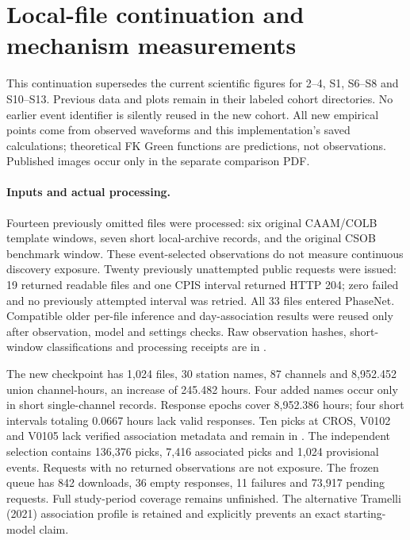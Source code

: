 \section{Local-file continuation and mechanism measurements}
This continuation supersedes the current scientific figures for 2--4, S1, S6--S8 and S10--S13. Previous data and plots remain in their labeled cohort directories. No earlier event identifier is silently reused in the new cohort. All new empirical points come from observed waveforms and this implementation's saved calculations; theoretical FK Green functions are predictions, not observations. Published images occur only in the separate comparison PDF.

\paragraph{Inputs and actual processing.}
Fourteen previously omitted files were processed: six original CAAM/COLB template windows, seven short local-archive records, and the original CSOB benchmark window. These event-selected observations do not measure continuous discovery exposure. Twenty previously unattempted public requests were issued: 19 returned readable files and one CPIS interval returned HTTP 204; zero failed and no previously attempted interval was retried. All 33 files entered PhaseNet. Compatible older per-file inference and day-association results were reused only after observation, model and settings checks. Raw observation hashes, short-window classifications and processing receipts are in .

The new checkpoint has 1,024 files, 30 station names, 87 channels and 8,952.452 union channel-hours, an increase of 245.482 hours. Four added names occur only in short single-channel records. Response epochs cover 8,952.386 hours; four short intervals totaling 0.0667 hours lack valid responses. Ten picks at CROS, V0102 and V0105 lack verified association metadata and remain in . The independent selection contains 136,376 picks, 7,416 associated picks and 1,024 provisional events. Requests with no returned observations are not exposure. The frozen queue has 842 downloads, 36 empty responses, 11 failures and 73,917 pending requests. Full study-period coverage remains unfinished. The alternative Tramelli (2021) association profile is retained and explicitly prevents an exact starting-model claim.

